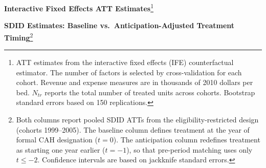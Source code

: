 \documentclass[a4paper, 12pt]{article}
\begin{document}
\clearpage

\begin{table}[!h]
\centering
\footnotesize
\begin{minipage}[h]{6in}
\caption[IFE ATT Estimates]{\textbf{Interactive Fixed Effects ATT Estimates}\footnote{ATT estimates from the interactive fixed effects (IFE) counterfactual estimator. The number of factors is selected by cross-validation for each cohort. Revenue and expense measures are in thousands of 2010 dollars per bed. $N_{tr}$ reports the total number of treated units across cohorts. Bootstrap standard errors based on 150 replications.}}
\label{tab:gsynth}
\centerline{}
\end{minipage}
\end{table}

\clearpage


\begin{table}[!h]
\centering
\begin{minipage}[h]{6in}
\caption[Anticipation-Adjusted Estimates]{\textbf{SDID Estimates: Baseline vs.\ Anticipation-Adjusted Treatment Timing}\footnote{Both columns report pooled SDID ATTs from the eligibility-restricted design (cohorts 1999--2005). The baseline column defines treatment at the year of formal CAH designation ($t=0$). The anticipation column redefines treatment as starting one year earlier ($t=-1$), so that pre-period matching uses only $t \leq -2$. Confidence intervals are based on jackknife standard errors.}}
\label{tab:anticipation}
\centerline{}
\end{minipage}
\end{table}

\clearpage


\end{document}
